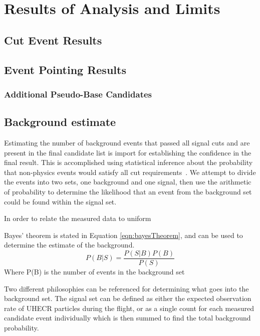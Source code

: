 			
\chapter{Results of Analysis and Limits}
\section{Cut Event Results}
	
\section{Event Pointing Results}
	\subsection{Additional Pseudo-Base Candidates}

\section{Background estimate}
	Estimating the number of background events that passed all signal cuts and are present in the final candidate list is import for establishing the confidence in the final result.  This is accomplished using statistical inference about the probability that non-physics events would satisfy all cut requirements~\cite{ClassicalStatisticalEstimation}.  We attempt to divide the events into two sets, one background and one signal, then use the arithmetic of probability to determine the likelihood that an event from the background set could be found within the signal set.  
	
	In order to relate the measured data to uniform 
	
	Bayes' theorem is stated in Equation \ref{eqn:bayesTheorem}, and can be used to determine the estimate of the background.
	\begin{equation}
		P(B | S) = \frac{P(S | B) P(B)}{P(S)}
		\label{eqn:bayesTheorem}
	\end{equation}
	Where P(B) is the number of events in the background set
	
	
	Two different philosophies can be referenced for determining what goes into the background set.  The signal set can be defined as either the expected observation rate of UHECR particles during the flight, or as a single count for each measured candidate event individually which is then summed to find the total background probability.
	
